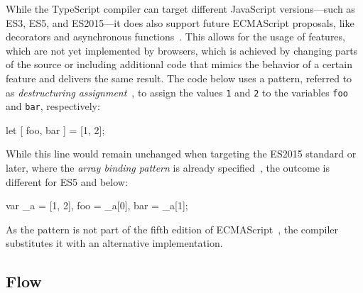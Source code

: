 While the TypeScript compiler can target different JavaScript versions---such as ES3, ES5, and ES2015---it does also support future ECMAScript proposals, like decorators and asynchronous functions~\cites{TypeScriptHandbook:CompilerOptions, TypeScriptWebsite}. This allows for the usage of features, which are not yet implemented by browsers, which is achieved by changing parts of the source or including additional code that mimics the behavior of a certain feature and delivers the same result. The code below uses a pattern, referred to as \emph{destructuring assignment}~\cite{DestructuringAssignment:Mozilla:2015}, to assign the values \texttt{1} and \texttt{2} to the variables \texttt{foo} and \texttt{bar}, respectively:
\begin{JsCode}[numbers=none]
let [ foo, bar ] = [1, 2];  
\end{JsCode}
While this line would remain unchanged when targeting the ES2015 standard or later, where the \emph{array binding pattern} is already specified~\cite[p.~198]{ES6Spec:Ecma:2015}, the outcome is different for ES5 and below:
\begin{JsCode}[numbers=none]
var _a = [1, 2], foo = _a[0], bar = _a[1];
\end{JsCode}
As the pattern is not part of the fifth edition of ECMAScript~\cite{ES5Spec:Ecma:2015}, the compiler substitutes it with an alternative implementation.
 
\subsection{Flow}
\label{sec:flow}

